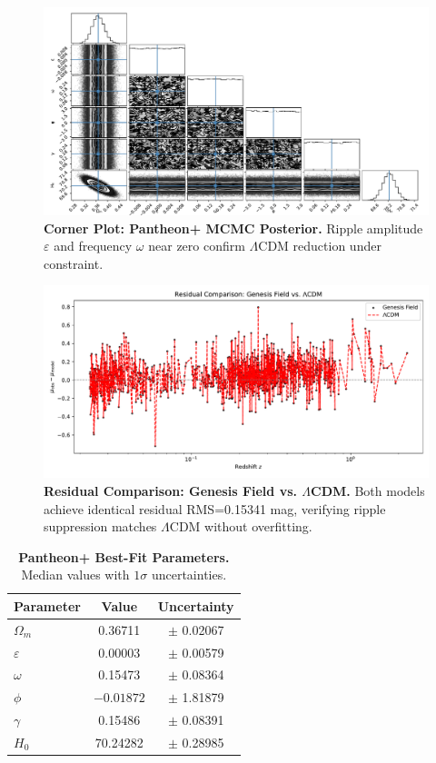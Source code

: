 \begin{figure}[htpb]
\centering
\includegraphics[width=\textwidth]{figures/sn_corners.pdf}
\caption{\textbf{Corner Plot: Pantheon+ MCMC Posterior.} Ripple amplitude $ \varepsilon $ and frequency $ \omega $ near zero confirm $ \Lambda $CDM reduction under constraint.}
\label{fig:corner_pantheon}
\end{figure}

\begin{figure}[htpb]
\centering
\includegraphics[width=\textwidth]{figures/residualcomparison.pdf}
\caption{\textbf{Residual Comparison: Genesis Field vs. $\Lambda$CDM.} Both models achieve identical residual RMS=0.15341 mag, verifying ripple suppression matches $\Lambda$CDM without overfitting.}
\label{fig:residual_comparison}
\end{figure}

\begin{table}[htpb]
\centering
\caption{\textbf{Pantheon+ Best-Fit Parameters.} Median values with $1\sigma$ uncertainties.}
\vspace{0.5em}
\begin{tabular}{lcc}
\hline
Parameter & Value & Uncertainty \\
\hline
$\Omega_m$   & 0.36711  & $\pm$ 0.02067 \\
$\varepsilon$ & 0.00003  & $\pm$ 0.00579 \\
$\omega$      & 0.15473  & $\pm$ 0.08364 \\
$\phi$        & $-0.01872$ & $\pm$ 1.81879 \\
$\gamma$      & 0.15486  & $\pm$ 0.08391 \\
$H_0$         & 70.24282 & $\pm$ 0.28985 \\
\hline
\end{tabular}
\label{tab:pantheon_params}
\end{table}

